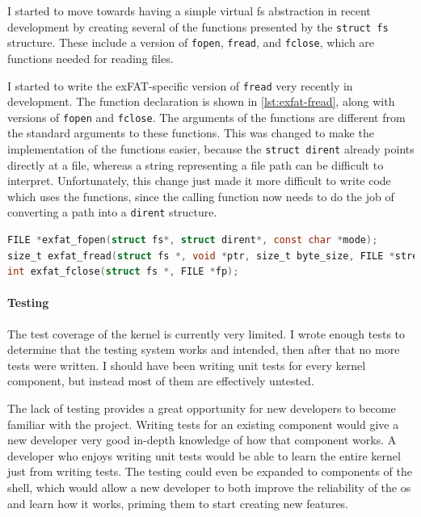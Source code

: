 \documentclass{article}
\begin{document}
I started to move towards having a simple virtual \gls{fs} abstraction in
recent development by creating several of the functions presented by the
\verb!struct fs! structure. These include a version of \texttt{fopen},
\texttt{fread}, and \texttt{fclose}, which are functions needed for reading
files.

I started to write the exFAT-specific version of \texttt{fread} very recently
in development. The function declaration is shown in \autoref{lst:exfat-fread},
along with versions of \texttt{fopen} and \texttt{fclose}. The arguments of the
functions are different from the standard arguments to these functions. This
was changed to make the implementation of the functions easier, because the
\verb!struct dirent! already points directly at a file, whereas a string
representing a file path can be difficult to interpret. Unfortunately, this
change just made it more difficult to write code which uses the functions,
since the calling function now needs to do the job of converting a path into a
\verb!dirent! structure.

\begin{lstlisting}[language=C,
                   caption={Function declarations of the exFAT versions of
                   \texttt{fopen}, \texttt{fread}, and \texttt{fclose}.},
                   float,
                   label={lst:exfat-fread}]
FILE *exfat_fopen(struct fs*, struct dirent*, const char *mode);
size_t exfat_fread(struct fs *, void *ptr, size_t byte_size, FILE *stream);
int exfat_fclose(struct fs *, FILE *fp);
\end{lstlisting}

\paragraph{Testing}
The test coverage of the kernel is currently very limited. I wrote enough tests
to determine that the testing system works and intended, then after that no
more tests were written. I should have been writing unit tests for every kernel
component, but instead most of them are effectively untested.

The lack of testing provides a great opportunity for new developers to become
familiar with the project. Writing tests for an existing component would give a
new developer very good in-depth knowledge of how that component works. A
developer who enjoys writing unit tests would be able to learn the entire
kernel just from writing tests. The testing could even be expanded to
components of the shell, which would allow a new developer to both improve the
reliability of the \gls{os} and learn how it works, priming them to start
creating new features.
\end{document}
